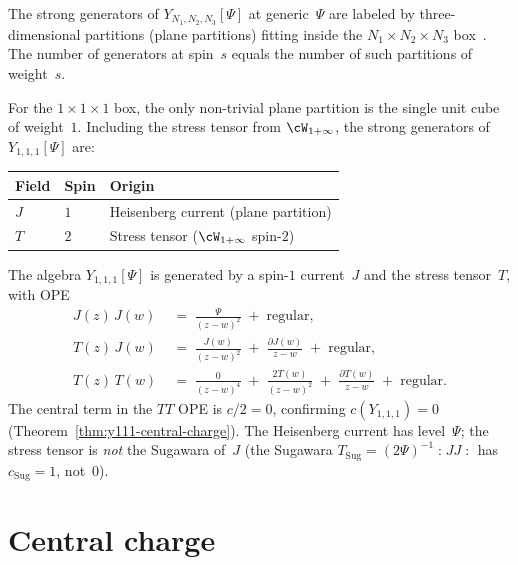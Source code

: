 The strong generators of $Y_{N_1,N_2,N_3}[\Psi]$ at
generic~$\Psi$ are labeled by three-dimensional partitions (plane
partitions) fitting inside the $N_1 \times N_2 \times N_3$
box~\cite[Theorem~3.1]{gaiotto-rapchak}. The number of
generators at spin~$s$ equals the number of such partitions of
weight~$s$.

\begin{computation}%
\label{comp:y111-generators}
For the $1 \times 1 \times 1$ box, the only non-trivial plane
partition is the single unit cube of weight~$1$. Including the
stress tensor from $\cW_{1+\infty}$, the strong generators of
$Y_{1,1,1}[\Psi]$ are:
\begin{center}
\begin{tabular}{lll}
\toprule
\textbf{Field} & \textbf{Spin} & \textbf{Origin} \\
\midrule
$J$ & $1$ & Heisenberg current (plane partition) \\
$T$ & $2$ & Stress tensor ($\cW_{1+\infty}$ spin-$2$) \\
\bottomrule
\end{tabular}
\end{center}
The algebra $Y_{1,1,1}[\Psi]$ is generated by a spin-$1$
current~$J$ and the stress tensor~$T$, with OPE
\begin{align}
J(z)\,J(w) &\;=\; \frac{\Psi}{(z-w)^2}
 \;+\; \text{regular},
 \label{eq:y111-jj-ope} \\
T(z)\,J(w) &\;=\; \frac{J(w)}{(z-w)^2}
 \;+\; \frac{\partial J(w)}{z-w}
 \;+\; \text{regular},
 \label{eq:y111-tj-ope} \\
T(z)\,T(w) &\;=\;
 \frac{0}{(z-w)^4}
 \;+\; \frac{2T(w)}{(z-w)^2}
 \;+\; \frac{\partial T(w)}{z-w}
 \;+\; \text{regular}.
 \label{eq:y111-tt-ope}
\end{align}
The central term in the $TT$ OPE is $c/2 = 0$, confirming
$c(Y_{1,1,1}) = 0$
(Theorem~\textup{\ref{thm:y111-central-charge}}). The
Heisenberg current has level~$\Psi$; the stress tensor is
\emph{not} the Sugawara of~$J$ (the Sugawara
$T_{\mathrm{Sug}} = (2\Psi)^{-1}\mathopen{:}JJ\mathclose{:}$
has $c_{\mathrm{Sug}} = 1$, not~$0$).
\end{computation}


\section{Central charge}%
\label{sec:y-central-charge}

